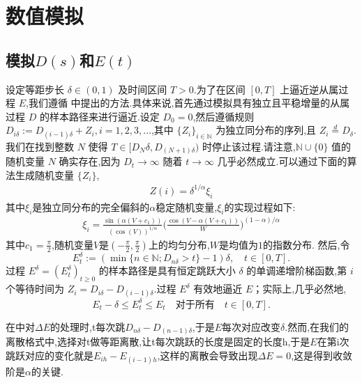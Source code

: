 

\chapter{数值模拟}

\section{模拟$D(s)$和$E(t)$}
设定等距步长 $\delta \in (0,1)$ 及时间区间 $T > 0$.为了在区间 $[0,T]$ 上逼近逆从属过程 $E$,我们遵循 \cite{magdziarz2009stochastic} 中提出的方法.具体来说,首先通过模拟具有独立且平稳增量的从属过程 $D$ 的样本路径来进行逼近.设定 $D_0 = 0$,然后遵循规则 $D_{i\delta} := D_{(i-1)\delta} + Z_i, i=1,2,3,\ldots$,其中 $\{Z_i\}_{i \in \mathbb{N}}$ 为独立同分布的序列,且 $Z_i \stackrel{d}{=} D_{\delta}$.我们在找到整数 $N$ 使得 $T \in [D_N\delta, D_{(N+1)\delta})$ 时停止该过程.请注意,$\mathbb{N}\cup\{0\}$ 值的随机变量 $N$ 确实存在,因为 $D_t \to \infty$ 随着 $t \to \infty$ 几乎必然成立.可以通过下面的算法生成随机变量 $\{Z_i\}$,
\begin{align*}
	Z(i)=\delta^{1/\alpha}\xi_{i}
\end{align*}
其中$\xi_i$是独立同分布的完全偏斜的$\alpha$稳定随机变量,$\xi_i$的实现过程如下:
\begin{align*}
	\xi_i=\frac{\sin(\alpha(V+c_1))}{\left(\cos(V)\right)^{1/\alpha}}\Big(\frac{\cos(V-\alpha(V+c_1))}{W}\Big)^{(1-\alpha)/\alpha}
\end{align*}
其中$c_1 = \frac{\pi}{2}$,随机变量$V$是$(-\frac{\pi}{2},\frac{\pi}{2})$上的均匀分布,$W$是均值为$1$的指数分布.
然后,令
$$
E_t^\delta := \left(\min\{n \in \mathbb{N}; D_{n\delta} > t\} - 1\right)\delta, \quad t \in [0, T].
$$
过程 $E^\delta = (E_t^\delta)_{t \geq 0}$ 的样本路径是具有恒定跳跃大小 $\delta$ 的单调递增阶梯函数,第 $i$ 个等待时间为 $Z_i = D_{i\delta} - D_{(i-1)\delta}$.过程 $E^\delta$ 有效地逼近 $E$；实际上,几乎必然地,
$$
E_t - \delta \leq E_t^\delta \leq E_t \quad \text{对于所有} \quad t \in [0, T].
$$

在\cite{jin2019strong}中对$\Delta E$的处理时,t每次跳$D_{n\delta} - D_{(n-1)\delta}$,于是$E$每次对应改变$\delta$.然而,在我们的离散格式中,选择对t做等距离散,让t每次跳跃的长度是固定的长度h,于是$E$在第i次跳跃对应的变化就是$E_{ih} - E_{(i-1)h}$,这样的离散会导致出现$\Delta E=0$,这是得到收敛阶是$\alpha$的关键.

